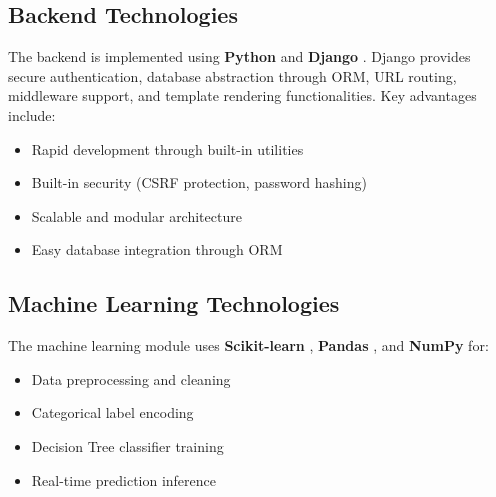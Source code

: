 \subsection{Backend Technologies}

The backend is implemented using \textbf{Python} and \textbf{Django} \cite{django2026}. Django provides secure authentication, database abstraction through ORM, URL routing, middleware support, and template rendering functionalities. Key advantages include:

\begin{itemize}
    \item Rapid development through built-in utilities
    \item Built-in security (CSRF protection, password hashing)
    \item Scalable and modular architecture
    \item Easy database integration through ORM
\end{itemize}

\subsection{Machine Learning Technologies}

The machine learning module uses \textbf{Scikit-learn} \cite{pedregosa2011}, \textbf{Pandas} \cite{mckinney2010}, and \textbf{NumPy} for:

\begin{itemize}
    \item Data preprocessing and cleaning
    \item Categorical label encoding
    \item Decision Tree classifier training
    \item Real-time prediction inference
\end{itemize}
